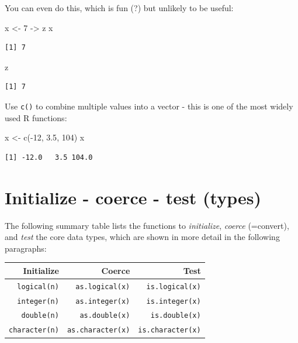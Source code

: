 \documentclass[
]{book}
\newenvironment{Shaded}{\begin{snugshade}}{\end{snugshade}}
\newcommand{\DecValTok}[1]{\textcolor[rgb]{0.00,0.00,0.81}{#1}}
\newcommand{\FloatTok}[1]{\textcolor[rgb]{0.00,0.00,0.81}{#1}}
\newcommand{\FunctionTok}[1]{\textcolor[rgb]{0.00,0.00,0.00}{#1}}
\newcommand{\NormalTok}[1]{#1}
\newcommand{\OtherTok}[1]{\textcolor[rgb]{0.56,0.35,0.01}{#1}}
\newcommand{\SpecialCharTok}[1]{\textcolor[rgb]{0.00,0.00,0.00}{#1}}
\begin{document}
You can even do this, which is fun (?) but unlikely to be useful:

\begin{Shaded}
\begin{Highlighting}[]
\NormalTok{x }\OtherTok{\textless{}{-}} \DecValTok{7} \OtherTok{{-}\textgreater{}}\NormalTok{ z}
\NormalTok{x}
\end{Highlighting}
\end{Shaded}

\begin{verbatim}
[1] 7
\end{verbatim}

\begin{Shaded}
\begin{Highlighting}[]
\NormalTok{z}
\end{Highlighting}
\end{Shaded}

\begin{verbatim}
[1] 7
\end{verbatim}

Use \texttt{c()} to combine multiple values into a vector - this is one of the most widely used R functions:

\begin{Shaded}
\begin{Highlighting}[]
\NormalTok{x }\OtherTok{\textless{}{-}} \FunctionTok{c}\NormalTok{(}\SpecialCharTok{{-}}\DecValTok{12}\NormalTok{, }\FloatTok{3.5}\NormalTok{, }\DecValTok{104}\NormalTok{)}
\NormalTok{x}
\end{Highlighting}
\end{Shaded}

\begin{verbatim}
[1] -12.0   3.5 104.0
\end{verbatim}

\hypertarget{initialize---coerce---test-types}{%
\section{Initialize - coerce - test (types)}\label{initialize---coerce---test-types}}

The following summary table lists the functions to \emph{initialize}, \emph{coerce} (=convert), and \emph{test} the core data types, which are shown in more detail in the following paragraphs:

\begin{longtable}[]{@{}rrr@{}}
\toprule
\textbf{Initialize} & \textbf{Coerce} & \textbf{Test}\tabularnewline
\midrule
\endhead
\texttt{logical(n)} & \texttt{as.logical(x)} & \texttt{is.logical(x)}\tabularnewline
\texttt{integer(n)} & \texttt{as.integer(x)} & \texttt{is.integer(x)}\tabularnewline
\texttt{double(n)} & \texttt{as.double(x)} & \texttt{is.double(x)}\tabularnewline
\texttt{character(n)} & \texttt{as.character(x)} & \texttt{is.character(x)}\tabularnewline
\bottomrule
\end{longtable}
\end{document}
